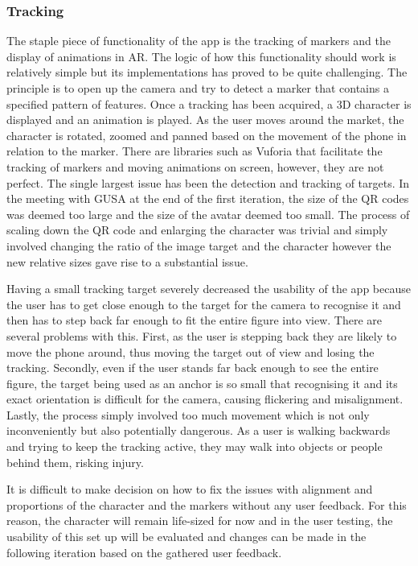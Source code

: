 \documentclass{l4proj}
\begin{document}
\subsubsection{Tracking}
The staple piece of functionality of the app is the tracking of markers and the display of animations in AR. The logic of how this functionality should work is relatively simple but its implementations has proved to be quite challenging. The principle is to open up the camera and try to detect a marker that contains a specified pattern of features. Once a tracking has been acquired, a 3D character is displayed and an animation is played. As the user moves around the market, the character is rotated, zoomed and panned based on the movement of the phone in relation to the marker. There are libraries such as Vuforia that facilitate the tracking of markers and moving animations on screen, however, they are not perfect. The single largest issue has been the detection and tracking of targets. In the meeting with GUSA at the end of the first iteration, the size of the QR codes was deemed too large and the size of the avatar deemed too small. The process of scaling down the QR code and enlarging the character was trivial and simply involved changing the ratio of the image target and the character however the new relative sizes gave rise to a substantial issue.

Having a small tracking target severely decreased the usability of the app because the user has to get close enough to the target for the camera to recognise it and then has to step back far enough to fit the entire figure into view. There are several problems with this. First, as the user is stepping back they are likely to move the phone around, thus moving the target out of view and losing the tracking. Secondly, even if the user stands far back enough to see the entire figure, the target being used as an anchor is so small that recognising it and its exact orientation is difficult for the camera, causing flickering and misalignment. Lastly, the process simply involved too much movement which is not only inconveniently but also potentially dangerous. As a user is walking backwards and trying to keep the tracking active, they may walk into objects or people behind them, risking injury. 

It is difficult to make decision on how to fix the issues with alignment and proportions of the character and the markers without any user feedback. For this reason, the character will remain life-sized for now and in the user testing, the usability of this set up will be evaluated and changes can be made in the following iteration based on the gathered user feedback. 
\end{document}
